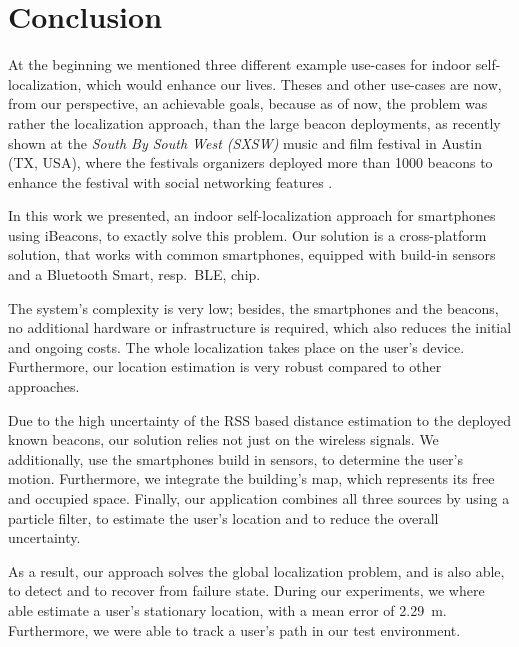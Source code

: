 \chapter{Conclusion} \label{chap:conclusion}
At the beginning we mentioned three different example use-cases for indoor self-localization, which would enhance our lives. Theses and other use-cases are now, from our perspective, an achievable goals, because as of now, the problem was rather the localization approach, than the large beacon deployments, as recently shown at the \emph{South By South West (SXSW)} music and film festival in Austin (TX, USA), where the festivals organizers deployed more than 1000 beacons to enhance the festival with social networking features \citep{mashable}.

In this work we presented, an indoor self-localization approach for smartphones using iBeacons, to exactly solve this problem. Our solution is a cross-platform solution, that works with common smartphones, equipped with build-in sensors and a Bluetooth Smart, resp.\ \acl{BLE}, chip.

The system's complexity is very low; besides, the smartphones and the beacons, no additional hardware or infrastructure is required, which also reduces the initial and ongoing costs. The whole localization takes place on the user's device. Furthermore, our location estimation is very robust compared to other approaches.

Due to the high uncertainty of the \acs{RSS} based distance estimation to the deployed known beacons, our solution relies not just on the wireless signals. We additionally, use the smartphones build in sensors, to determine the user's motion. Furthermore, we integrate the building's map, which represents its free and occupied space. Finally, our application combines all three sources by using a particle filter, to estimate the user's location and to reduce the overall uncertainty.

As a result, our approach solves the global localization problem, and is also able, to detect and to recover from failure state. During our experiments, we where able estimate a user's stationary location, with a mean error of 2.29~m. Furthermore, we were able to track a user's path in our test environment. 



